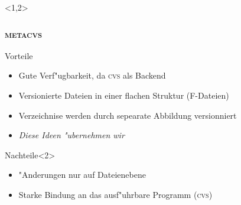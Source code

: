 \documentclass[german]{beamer}
\newcommand{\METACVS}{\textsc{metacvs}}
\newcommand{\CVS}{\textsc{cvs}}
\begin{document}
  

\begin{frame}<1,2>
  \frametitle{\METACVS}
  \begin{block}{Vorteile}%
    \begin{itemize}
    \item Gute Verf"ugbarkeit, da \CVS{} als Backend
    \item Versionierte Dateien in einer flachen Struktur (F-Dateien)
    \item Verzeichnise werden durch sepearate Abbildung versionniert
    \item<2> \emph{Diese Ideen "ubernehmen wir}
    \end{itemize}
  \end{block}
  \begin{block}{Nachteile}<2>
    \begin{itemize}
    \item "Anderungen nur auf Dateienebene
    \item Starke Bindung an das ausf"uhrbare Programm (\CVS{})
    \end{itemize}
  \end{block}
\end{frame}
\end{document}
